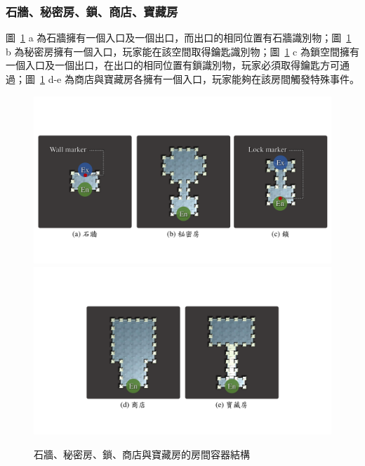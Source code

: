 \subsubsection{石牆、秘密房、鎖、商店、寶藏房}
\label{sssec:method-spacepieces-types-special}

圖~\ref{fig:roomtype-special} a 為石牆擁有一個入口及一個出口，而出口的相同位置有石牆識別物；圖~\ref{fig:roomtype-special} b 為秘密房擁有一個入口，玩家能在該空間取得鑰匙識別物；圖~\ref{fig:roomtype-special} c 為鎖空間擁有一個入口及一個出口，在出口的相同位置有鎖識別物，玩家必須取得鑰匙方可通過；圖~\ref{fig:roomtype-special} d-e 為商店與寶藏房各擁有一個入口，玩家能夠在該房間觸發特殊事件。

\begin{figure}[!htb]
  \begin{center}
    \includegraphics[width=1.0\textwidth]{figures/roomtype-special.pdf}
    \includegraphics[width=1.0\textwidth]{figures/roomtype-special-.pdf}
    \caption{石牆、秘密房、鎖、商店與寶藏房的房間容器結構}
    \label{fig:roomtype-special}
  \end{center}
\end{figure}

